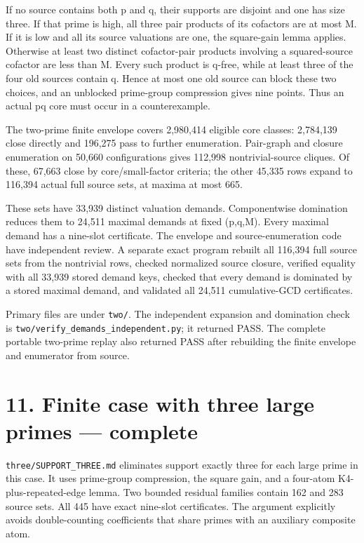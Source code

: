 \documentclass[11pt,a4paper]{article}
\begin{document}
If no source contains both p and q, their supports are disjoint and one
has size three. If that prime is high, all three pair products of its
cofactors are at most M. If it is low and all its source valuations are
one, the square-gain lemma applies. Otherwise at least two distinct
cofactor-pair products involving a squared-source cofactor are less than
M. Every such product is q-free, while at least three of the four old
sources contain q. Hence at most one old source can block these two
choices, and an unblocked prime-group compression gives nine points.
Thus an actual pq core must occur in a counterexample.

The two-prime finite envelope covers 2,980,414 eligible core classes:
2,784,139 close directly and 196,275 pass to further enumeration.
Pair-graph and closure enumeration on 50,660 configurations gives
112,998 nontrivial-source cliques. Of these, 67,663 close by
core/small-factor criteria; the other 45,335 rows expand to 116,394
actual full source sets, at maxima at most 665.

These sets have 33,939 distinct valuation demands. Componentwise
domination reduces them to 24,511 maximal demands at fixed (p,q,M).
Every maximal demand has a nine-slot certificate. The envelope and
source-enumeration code have independent review. A separate exact
program rebuilt all 116,394 full source sets from the nontrivial rows,
checked normalized source closure, verified equality with all 33,939
stored demand keys, checked that every demand is dominated by a stored
maximal demand, and validated all 24,511 cumulative-GCD certificates.

Primary files are under \nolinkurl{two/}. The independent expansion and
domination check is \nolinkurl{two/verify_demands_independent.py}; it
returned PASS. The complete portable two-prime replay also returned PASS
after rebuilding the finite envelope and enumerator from source.

\section{11. Finite case with three large primes ---
complete}\label{finite-case-with-three-large-primes-complete}

\nolinkurl{three/SUPPORT_THREE.md} eliminates support exactly three for
each large prime in this case. It uses prime-group compression, the
square gain, and a four-atom K4-plus-repeated-edge lemma. Two bounded
residual families contain 162 and 283 source sets. All 445 have exact
nine-slot certificates. The argument explicitly avoids double-counting
coefficients that share primes with an auxiliary composite atom.
\end{document}
